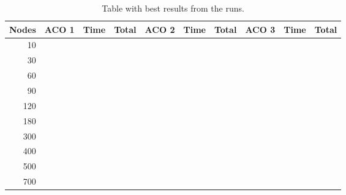 \documentclass[a4paper]{scrartcl}
\begin{document}
\begin{table}
    \begin{adjustwidth}{-.5in}{-.5in}  
        \begin{center}
\begin{tabular}{r | r | r | r | r | r | r | r | r | r}
\hline
Nodes & ACO 1 & Time & Total & ACO 2 & Time & Total & ACO 3 & Time & Total \\
\hline \hline 
10 &  &  &  &  &  &  &  &  &  \\
\hline
30 &  &  &  &  &  &  &  &  &  \\
\hline
60 &  &  &  &  &  &  &  &  &  \\
\hline
90 &  &  &  &  &  &  &  &  &  \\
\hline
120 &  &  &  &  &  &  &  &  &  \\
\hline
180 &  &  &  &  &  &  &  &  &  \\
\hline
300 &  &  &  &  &  &  &  &  &  \\
\hline
400 &  &  &  &  &  &  &  &  &  \\
\hline
500 &  &  &  &  &  &  &  &  &  \\
\hline
700 &  &  &  &  &  &  &  &  &  \\
\hline
\end{tabular}

        \caption{Table with best results from the runs. }
        \label{myTable}
        \end{center}
    \end{adjustwidth}
\end{table}



\end{document}
